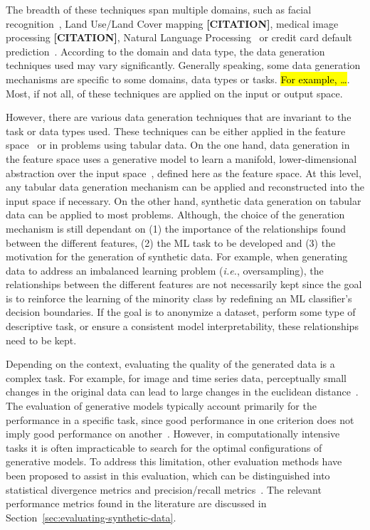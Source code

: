 \documentclass[parskip=full]{scrartcl}
\begin{document}
The breadth of these techniques span multiple domains, such as facial
recognition~\cite{lv2017data}, Land Use/Land Cover mapping
\textbf{[CITATION]}, medical image processing \textbf{[CITATION]}, Natural
Language Processing~\cite{feng2021survey} or credit card default
prediction~\cite{alam2020investigation}. According to the domain and data
type, the data generation techniques used may vary significantly. Generally
speaking, some data generation mechanisms are specific to some domains, data
types or tasks. \hl{For example, \ldots}. Most, if not all, of these
techniques are applied on the input or output space.

However, there are various data generation techniques that are invariant to
the task or data types used. These techniques can be either applied in the
feature space~\cite{devries2017dataset} or in problems using tabular data.  On
the one hand, data generation in the feature space uses a generative model to
learn a manifold, lower-dimensional abstraction over the input
space~\cite{kingma2019introduction}, defined here as the feature space.  At
this level, any tabular data generation mechanism can be applied and
reconstructed into the input space if necessary. On the other hand, synthetic
data generation on tabular data can be applied to most problems. Although, the
choice of the generation mechanism is still dependant on (1) the importance of
the relationships found between the different features, (2) the ML task to be
developed and (3) the motivation for the generation of synthetic data. For
example, when generating data to address an imbalanced learning problem
(\textit{i.e.}, oversampling), the relationships between the different
features are not necessarily kept since the goal is to reinforce the learning
of the minority class by redefining an ML classifier's decision boundaries. If
the goal is to anonymize a dataset, perform some type of descriptive task, or
ensure a consistent model interpretability, these relationships need to be
kept.

Depending on the context, evaluating the quality of the generated data is a
complex task. For example, for image and time series data, perceptually small
changes in the original data can lead to large changes in the euclidean
distance~\cite{assefa2020generating, theis2016note}. The evaluation of
generative models typically account primarily for the performance in a
specific task, since good performance in one criterion does not imply good
performance on another~\cite{theis2016note}. However, in computationally
intensive tasks it is often impracticable to search for the optimal
configurations of generative models. To address this limitation, other
evaluation methods have been proposed to assist in this evaluation, which can
be distinguished into statistical divergence metrics and precision/recall
metrics~\cite{alaa2022faithful}. The relevant performance metrics found in the
literature are discussed in Section~\ref{sec:evaluating-synthetic-data}.
\end{document}
